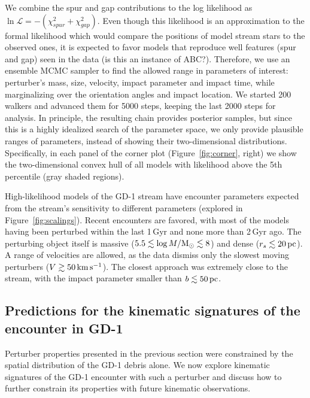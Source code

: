 \documentclass[twocolumn]{aastex62}
\begin{document}
We combine the spur and gap contributions to the log likelihood as $\ln\mathcal{L} = -(\chi^2_{spur} + \chi^2_{gap})$.
Even though this likelihood is an approximation to the formal likelihood which would compare the positions of model stream stars to the observed ones, it is expected to favor models that reproduce well features (spur and gap) seen in the data (is this an instance of ABC?).
Therefore, we use an ensemble MCMC sampler \citep{Foreman-Mackey:2013} to find the allowed range in parameters of interest: perturber's mass, size, velocity, impact parameter and impact time, while marginalizing over the orientation angles and impact location.
We started 200 walkers and advanced them for 5000 steps, keeping the last 2000 steps for analysis.
In principle, the resulting chain provides posterior samples, but since this is a highly idealized search of the parameter space, we only provide plausible ranges of parameters, instead of showing their two-dimensional distributions.
Specifically, in each panel of the corner plot (Figure~\ref{fig:corner}, right) we show the two-dimensional convex hull of all models with likelihood above the 5th percentile (gray shaded regions).

High-likelihood models of the GD-1 stream have encounter parameters expected from the stream's sensitivity to different parameters (explored in Figure~\ref{fig:scalings}).
Recent encounters are favored, with most of the models having been perturbed within the last 1\,Gyr and none more than 2\,Gyr ago.
The perturbing object itself is massive ($5.5\lesssim\log M/\rm M_\odot\lesssim8$) and dense ($r_s\lesssim20\,\rm pc$).
A range of velocities are allowed, as the data dismiss only the slowest moving perturbers ($V\gtrsim50\,\rm km\,s^{-1}$).
The closest approach was extremely close to the stream, with the impact parameter smaller than $b\lesssim50\rm\,pc$.


\subsection{Predictions for the kinematic signatures of the encounter in GD-1}
\label{sec:kinematics}
Perturber properties presented in the previous section were constrained by the spatial distribution of the GD-1 debris alone.
We now explore kinematic signatures of the GD-1 encounter with such a perturber and discuss how to further constrain its properties with future kinematic observations.
\end{document}
